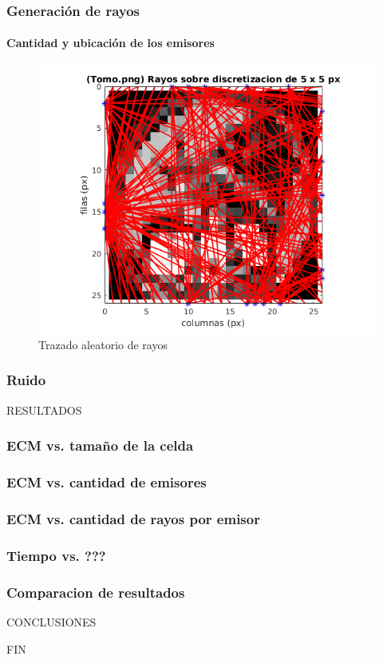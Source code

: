 \documentclass[11pt]{beamer}
\begin{document}
\begin{frame}
\frametitle{Generación de rayos}
\framesubtitle{Cantidad y ubicación de los emisores}
\begin{figure}[H] 
\centering
\includegraphics[scale=0.5]{img/rayos_tomo25x25px.png}
\caption{Trazado aleatorio de rayos}
\label{fig:rayos aleatorios}
\end{figure}
\end{frame}


\begin{frame}
\frametitle{Ruido}
\end{frame}


\begin{frame}{RESULTADOS}
\frametitle{ECM vs. tamaño de la celda}
\end{frame}



\begin{frame}
\frametitle{ECM vs. cantidad de emisores}
\end{frame}

\begin{frame}
\frametitle{ECM vs. cantidad de rayos por emisor}
\end{frame}


\begin{frame}
\frametitle{Tiempo vs. ???}
\end{frame}


\begin{frame}
\frametitle{Comparacion de resultados}
\end{frame}

\begin{frame}{CONCLUSIONES}
\end{frame}

\begin{frame}{FIN}
\end{frame}



\end{document}
